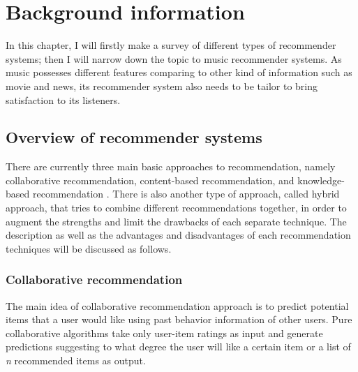
\chapter{Background information} %
\label{Chapter2} 




In this chapter, I will firstly make a survey of different types of recommender systems; then I will narrow down the topic to music recommender systems. As music possesses different features comparing to other kind of information such as movie and news, its recommender system also needs to be tailor to bring satisfaction to its listeners.

\section{Overview of recommender systems}
There are currently three main basic approaches to recommendation, namely collaborative recommendation, content-based recommendation, and knowledge-based recommendation \cite{jannach2010recommender}. There is also another type of approach, called hybrid approach, that tries to combine different recommendations together, in order to augment the strengths and limit the drawbacks of each separate technique. The description as well as the advantages and disadvantages of each recommendation techniques will be discussed as follows.

\subsection{Collaborative recommendation}
The main idea of collaborative recommendation approach is to predict potential items that a user would like using past behavior information of other users. Pure collaborative algorithms take only user-item ratings as input and generate predictions suggesting to what degree the user will like a certain item or a list of \textit{n} recommended items as output. 

